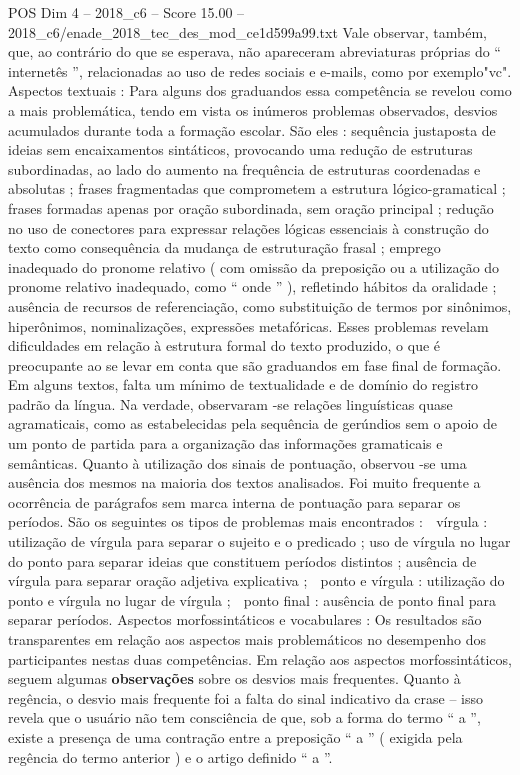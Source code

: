 \begin{textsample}{POS Dim 4 – 2018\_c6 – Score 15.00 – 2018\_c6/enade\_2018\_tec\_des\_mod\_ce1d599a99.txt}
Vale observar, também, que, ao contrário do que se esperava, não apareceram abreviaturas próprias do “ internetês ”, relacionadas ao uso de redes sociais e e-mails, como por exemplo"vc".
Aspectos textuais : Para alguns dos graduandos essa competência se revelou como a mais problemática, tendo em vista os inúmeros problemas observados, desvios acumulados durante toda a formação escolar.
São eles : sequência justaposta de ideias sem encaixamentos sintáticos, provocando uma redução de estruturas subordinadas, ao lado do aumento na frequência de estruturas coordenadas e absolutas ; frases fragmentadas que comprometem a estrutura lógico-gramatical ; frases formadas apenas por oração subordinada, sem oração principal ; redução no uso de conectores para expressar relações lógicas essenciais à construção do texto como consequência da mudança de estruturação frasal ; emprego inadequado do pronome relativo ( com omissão da preposição ou a utilização do pronome relativo inadequado, como “ onde ” ), refletindo hábitos da oralidade ; ausência de recursos de referenciação, como substituição de termos por sinônimos, hiperônimos, nominalizações, expressões metafóricas.
Esses problemas revelam dificuldades em relação à estrutura formal do texto produzido, o que é preocupante ao se levar em conta que são graduandos em fase final de formação.
Em alguns textos, falta um mínimo de textualidade e de domínio do registro padrão da língua.
Na verdade, observaram -se relações linguísticas quase agramaticais, como as estabelecidas pela sequência de gerúndios sem o apoio de um ponto de partida para a organização das informações gramaticais e semânticas.
Quanto à utilização dos sinais de pontuação, observou -se uma ausência dos mesmos na maioria dos textos analisados.
Foi muito frequente a ocorrência de parágrafos sem marca interna de pontuação para separar os períodos.
São os seguintes os tipos de problemas mais encontrados :  vírgula : utilização de vírgula para separar o sujeito e o predicado ; uso de vírgula no lugar do ponto para separar ideias que constituem períodos distintos ; ausência de vírgula para separar oração adjetiva explicativa ;  ponto e vírgula : utilização do ponto e vírgula no lugar de vírgula ;  ponto final : ausência de ponto final para separar períodos.
Aspectos morfossintáticos e vocabulares : Os resultados são transparentes em relação aos aspectos mais problemáticos no desempenho dos participantes nestas duas competências.
Em relação aos aspectos morfossintáticos, seguem algumas \textbf{observações} sobre os desvios mais frequentes.
Quanto à regência, o desvio mais frequente foi a falta do sinal indicativo da crase – isso revela que o usuário não tem consciência de que, sob a forma do termo “ a ”, existe a presença de uma contração entre a preposição “ a ” ( exigida pela regência do termo anterior ) e o artigo definido “ a ”.

\end{textsample}

